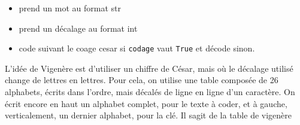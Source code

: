 \begin{exercice_cours}{}

	

	\begin{itemize}
		\item prend un mot au format str
		\item prend un décalage au format int
		\item code suivant le coage cesar si \verb|codage| vaut \verb|True| et décode sinon.
	\end{itemize}
\end{exercice_cours}

\begin{exercice_cours}{}

	\medskip

	L'idée de Vigenère est d'utiliser un chiffre de César, mais où le décalage utilisé change de lettres en lettres. Pour cela, on utilise une table composée de 26 alphabets, écrits dans l’ordre, mais décalés de ligne en ligne d’un caractère. On écrit encore en haut un alphabet complet, pour le texte à coder, et à gauche, verticalement, un dernier alphabet, pour la clé. Il sagit de la table de vigenère

\end{exercice_cours}
